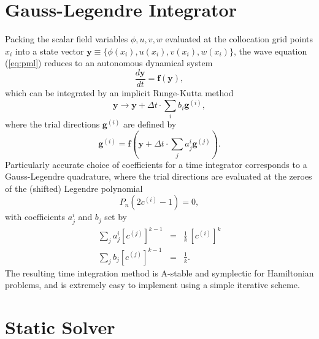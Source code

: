 \documentclass[aps,prd,reprint,twocolumn,groupedaddress]{revtex4-1}
\renewcommand{\vec}[1]{\mathbf{#1}}
\begin{document}
\section{Gauss-Legendre Integrator}

Packing the scalar field variables $\phi,u,v,w$ evaluated at the collocation grid points $x_i$ into a state vector $\vec{y} \equiv \{ \phi(x_i), u(x_i), v(x_i), w(x_i) \}$, the wave equation (\ref{eq:pml}) reduces to an autonomous dynamical system
\begin{equation}
  \frac{d\vec{y}}{dt} = \vec{f}(\vec{y}),
\end{equation}
which can be integrated by an implicit Runge-Kutta method \cite{Butcher:1964fx}
\begin{equation}
  \vec{y} \rightarrow \vec{y} + \Delta t \cdot \sum\limits_i b_i \vec{g}^{(i)},
\end{equation}
where the trial directions $\vec{g}^{(i)}$ are defined by
\begin{equation}
  \vec{g}^{(i)} = \vec{f}\left(\vec{y} + \Delta t \cdot \sum\limits_j a^i_j \vec{g}^{(j)}\right).
\end{equation}
Particularly accurate choice of coefficients for a time integrator corresponds to a Gauss-Legendre quadrature, where the trial directions are evaluated at the zeroes of the (shifted) Legendre polynomial
\begin{equation}
  P_n\left(2c^{(i)}-1\right) = 0,
\end{equation}
with coefficients $a^i_j$ and $b_j$ set by
\begin{eqnarray}
  \sum\limits_j a^i_j \left[c^{(j)}\right]^{k-1} &=& \frac{1}{k}\, \left[c^{(i)}\right]^k\\
  \sum\limits_j b_j \left[c^{(j)}\right]^{k-1} &=& \frac{1}{k}.
\end{eqnarray}
The resulting time integration method is A-stable and symplectic for Hamiltonian problems, and is extremely easy to implement using a simple iterative scheme.


\section{Static Solver}
\end{document}
